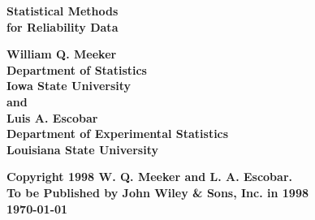 
\begin{titlepage}
\vspace{2in}
\begin{center}
{\Huge\bf Statistical Methods\\ for Reliability Data\\}
\end{center}
\vspace{.25in}
%
%
\begin{center}
\vspace*{1in}
{\Large \bf William Q. Meeker  \\
Department of Statistics \\
Iowa State University\\
\vspace*{0.25in}
and \\
\vspace*{0.25in}
Luis A. Escobar \\
Department of Experimental Statistics \\
Louisiana State University   \\}
\vspace*{0.5in}
\end{center}

{\Large {\bf Copyright 1998 W. Q. Meeker and L. A. Escobar.}}\\[1ex]
{ \large {\bf To be Published by John Wiley \& Sons, Inc. in 1998}}\\[5ex]
{\large {\bf \today}}


\end{titlepage}
